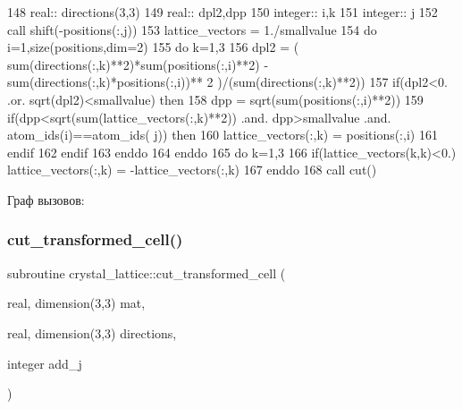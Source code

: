 \begin{DoxyCode}
148     \textcolor{keywordtype}{real}:: directions(3,3)
149     \textcolor{keywordtype}{real}:: dpl2,dpp
150     \textcolor{keywordtype}{integer}:: i,k
151     \textcolor{keywordtype}{integer}:: j
152     \textcolor{keyword}{call }shift(-positions(:,j))
153     lattice\_vectors = 1./smallvalue
154     \textcolor{keywordflow}{do} i=1,\textcolor{keyword}{size}(positions,dim=2)
155         \textcolor{keywordflow}{do} k=1,3
156             dpl2 = ( sum(directions(:,k)**2)*sum(positions(:,i)**2) - sum(directions(:,k)*positions(:,i))**
      2 )/(sum(directions(:,k)**2))
157             \textcolor{keywordflow}{if}(dpl2<0. .or. sqrt(dpl2)<smallvalue) \textcolor{keywordflow}{then}
158                 dpp = sqrt(sum(positions(:,i)**2))
159                 \textcolor{keywordflow}{if}(dpp<sqrt(sum(lattice\_vectors(:,k)**2)) .and. dpp>smallvalue .and. atom\_ids(i)==atom\_ids(
      j)) \textcolor{keywordflow}{then}
160                     lattice\_vectors(:,k) = positions(:,i)
161 \textcolor{keywordflow}{                endif}
162 \textcolor{keywordflow}{            endif}
163 \textcolor{keywordflow}{        enddo}
164 \textcolor{keywordflow}{    enddo}
165     \textcolor{keywordflow}{do} k=1,3
166         \textcolor{keywordflow}{if}(lattice\_vectors(k,k)<0.) lattice\_vectors(:,k) =  -lattice\_vectors(:,k)
167 \textcolor{keywordflow}{    enddo}
168     \textcolor{keyword}{call }cut()
\end{DoxyCode}
Граф вызовов\+:
\mbox{\label{namespacecrystal__lattice_a4521a112e9b35e44f528934fe2a532f1}} 
\subsubsection{\texorpdfstring{cut\+\_\+transformed\+\_\+cell()}{cut\_transformed\_cell()}}
{\footnotesize\ttfamily subroutine crystal\+\_\+lattice\+::cut\+\_\+transformed\+\_\+cell (\begin{DoxyParamCaption}\item[{real, dimension(3,3)}]{mat,  }\item[{real, dimension(3,3)}]{directions,  }\item[{integer}]{add\+\_\+j }\end{DoxyParamCaption})}



